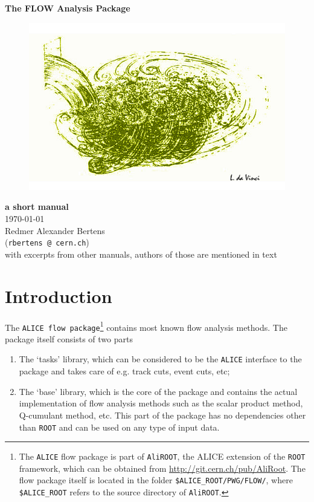 \documentclass[a4paper]{book}
\numberwithin{equation}{subsection}
\renewcommand{\thefootnote}{\fnsymbol{footnote}}
\begin{document}
\noindent
\begin{center}
	\vspace*{1.5cm}
	{\LARGE \bf The FLOW Analysis Package}\\
		
	\vspace{1.5cm}
	\begin{figure}[hbt]
		\includegraphics[width=1.\textwidth]{figs/daVinci.png}
	\end{figure}
		
	\vspace{1.5cm}
	\noindent
	{\large \bf a short manual}\\
	\today\\
\vfill
\noindent
Redmer Alexander Bertens \\ (\texttt{rbertens @ cern.ch}) \\
with excerpts from other manuals, authors of those are mentioned in text
\end{center}

\clearpage
\thispagestyle{empty}
\tableofcontents
\renewcommand{\thefootnote}{\alph{footnote}}
\mainmatter
\chapter{Introduction}
The \texttt{ALICE flow package}\footnote{The \texttt{ALICE} flow package is part of \texttt{AliROOT}, the ALICE extension of the \texttt{ROOT} framework, which can be obtained from \href{http://git.cern.ch/pub/AliRoot}{http://git.cern.ch/pub/AliRoot}. The flow package itself is located in the folder \texttt{\$ALICE\_ROOT/PWG/FLOW/}, where \texttt{\$ALICE\_ROOT} refers to the source directory of \texttt{AliROOT}.} contains most known flow analysis methods. The package itself consists of two parts
\begin{enumerate}
    \item The `tasks' library, which can be considered to be the \texttt{ALICE} interface to the package and takes care of e.g. track cuts, event cuts, etc;
    \item The `base' library, which is the core of the package and contains the actual implementation of flow analysis methods such as the scalar product method, Q-cumulant method, etc. This part of the package has no dependencies other than \texttt{ROOT} and can be used on any type of input data.
\end{enumerate}
\end{document}
